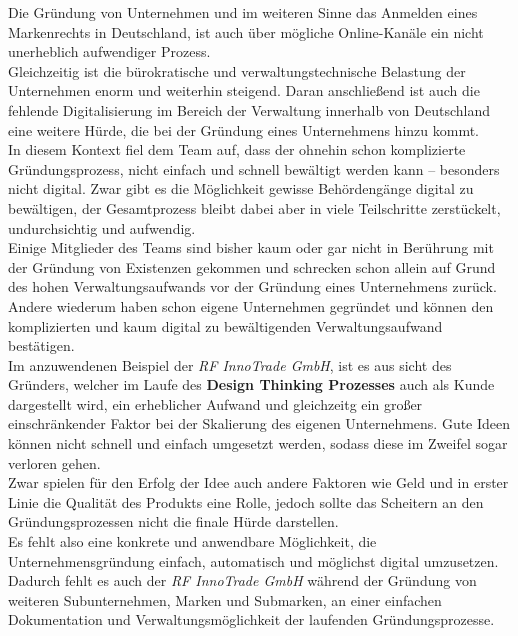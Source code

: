 Die Gründung von Unternehmen und im weiteren Sinne das Anmelden eines Markenrechts in Deutschland, ist auch über mögliche Online-Kanäle ein nicht unerheblich aufwendiger Prozess.\\
Gleichzeitig ist die bürokratische und verwaltungstechnische Belastung der Unternehmen enorm und weiterhin steigend. Daran anschließend ist auch die fehlende Digitalisierung im Bereich der Verwaltung innerhalb von Deutschland eine weitere Hürde, die bei der Gründung eines Unternehmens hinzu kommt.\\
In diesem Kontext fiel dem Team auf, dass der ohnehin schon komplizierte Gründungsprozess, nicht einfach und schnell bewältigt werden kann – besonders nicht digital. Zwar gibt es die Möglichkeit gewisse Behördengänge digital zu bewältigen, der Gesamtprozess bleibt dabei aber in viele Teilschritte zerstückelt, undurchsichtig und aufwendig.\\
Einige Mitglieder des Teams sind bisher kaum oder gar nicht in Berührung mit der Gründung von Existenzen gekommen und schrecken schon allein auf Grund des hohen Verwaltungsaufwands vor der Gründung eines Unternehmens zurück. Andere wiederum haben schon eigene Unternehmen gegründet und können den komplizierten und kaum digital zu bewältigenden Verwaltungsaufwand bestätigen.\\
Im anzuwendenen Beispiel der \textit{RF InnoTrade GmbH}, ist es aus sicht des Gründers, welcher im Laufe des \textbf{Design Thinking Prozesses} auch als Kunde dargestellt wird, ein erheblicher Aufwand und gleichzeitg ein großer einschränkender Faktor bei der Skalierung des eigenen Unternehmens. Gute Ideen können nicht schnell und einfach umgesetzt werden, sodass diese im Zweifel sogar verloren gehen.\\
Zwar spielen für den Erfolg der Idee auch andere Faktoren wie Geld und in erster Linie die Qualität des Produkts eine Rolle, jedoch sollte das Scheitern an den Gründungsprozessen nicht die finale Hürde darstellen.\\
Es fehlt also eine konkrete und anwendbare Möglichkeit, die Unternehmensgründung einfach, automatisch und möglichst digital umzusetzen. Dadurch fehlt es auch der \textit{RF InnoTrade GmbH} während der Gründung von weiteren Subunternehmen, Marken und Submarken, an einer einfachen Dokumentation und Verwaltungsmöglichkeit der laufenden Gründungsprozesse.\\